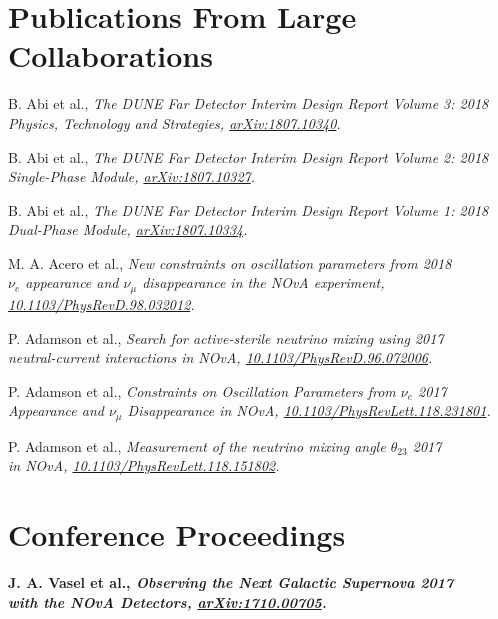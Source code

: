 \documentclass[11pt]{cv}
\begin{document}
\begin{cv}
\section{Publications From Large Collaborations}
\begin{etaremune}
  \item B. Abi et al., \it The DUNE Far Detector Interim Design Report Volume 3: \rm \hfill 2018 \\
  \it Physics, Technology and Strategies, \rm \href{https://arxiv.org/abs/1807.10340}{arXiv:1807.10340}.
  \item B. Abi et al., \it The DUNE Far Detector Interim Design Report Volume 2: \rm \hfill 2018 \\
  \it Single-Phase Module, \rm \href{https://arxiv.org/abs/1807.10327}{arXiv:1807.10327}.
  \item B. Abi et al., \it The DUNE Far Detector Interim Design Report Volume 1: \rm \hfill 2018 \\
  \it Dual-Phase Module, \rm \href{https://arxiv.org/abs/1807.10334}{arXiv:1807.10334}.
  \item M. A. Acero et al., \it New constraints on oscillation parameters from \rm \hfill 2018 \\
  \it $\nu_e$ appearance and $\nu_\mu$ disappearance in the NOvA experiment, \rm \\
  \href{https://doi.org/10.1103/PhysRevD.98.032012}{10.1103/PhysRevD.98.032012}.
  \item P. Adamson et al., \it Search for active-sterile neutrino mixing using \rm \hfill 2017 \\
  \it neutral-current interactions in NOvA, \rm \href{https://doi.org/10.1103/PhysRevD.96.072006}{10.1103/PhysRevD.96.072006}.
  \item P. Adamson et al., \it Constraints on Oscillation Parameters from $\nu_e$ \rm \hfill 2017 \\
  \it  Appearance and $\nu_\mu$ Disappearance in NOvA, \rm \href{https://doi.org/10.1103/PhysRevLett.118.231801}{10.1103/PhysRevLett.118.231801}.
  \item P. Adamson et al., \it Measurement of the neutrino mixing angle $\theta_{23}$ \rm \hfill 2017 \\
  \it in NOvA, \rm \href{https://doi.org/10.1103/PhysRevLett.118.151802}{10.1103/PhysRevLett.118.151802}.
\end{etaremune}


\section{Conference Proceedings}
\begin{etaremune}
  \item \bf J. A. Vasel \rm et al., \it Observing the Next Galactic Supernova \rm \hfill 2017 \\
  \it with the NOvA Detectors, \rm \href{http://arxiv.org/abs/arXiv:1710.00705}{arXiv:1710.00705}.
\end{etaremune}



\end{cv}
\end{document}

